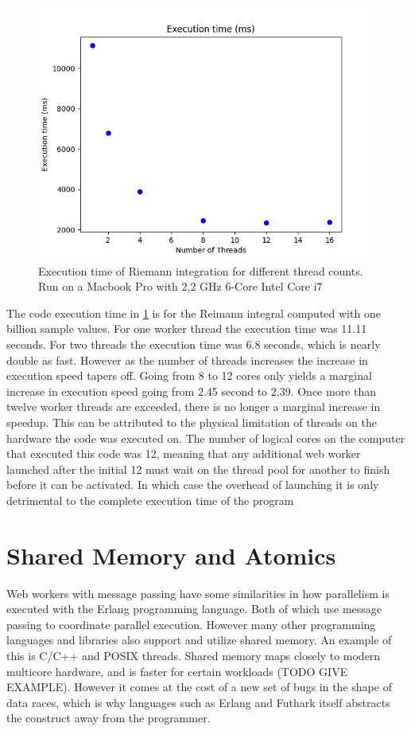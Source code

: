 \documentclass[11pt]{book}
\begin{document}
\begin{figure}[H]
\centerline{\includegraphics[width=\textwidth]{figures/integrate_exe_times.png}}
\caption{Execution time of Riemann integration for different thread counts. Run on a Macbook Pro with 2,2 GHz 6-Core Intel Core i7}
\label{png:integrate}
\end{figure}

The code execution time in \ref{png:integrate} is for the Reimann integral computed with one billion sample values. For one worker thread the execution time was 11.11 seconds. For two threads the execution time was 6.8 seconds, which is nearly double as fast. However as the number of threads increases the increase in execution speed tapers off. Going from 8 to 12 cores only yields a marginal increase in execution speed going from 2.45 second to 2.39. Once more than twelve worker threads are exceeded, there is no longer a marginal increase in speedup. This can be attributed to the physical limitation of threads on the hardware the code was executed on. The number of logical cores on the computer that executed this code was 12, meaning that any additional web worker launched after the initial 12 must wait on the thread pool for another to finish before it can be activated. In which case the overhead of launching it is only detrimental to the complete execution time of the program


\section{Shared Memory and Atomics}

Web workers with message passing have some similarities in how parallelism is executed with the Erlang programming language. Both of which use message passing to coordinate parallel execution. However many other programming languages and libraries also support and utilize shared memory. An example of this is C/C++ and POSIX threads. Shared memory maps closely to modern multicore hardware, and is faster for certain workloads (TODO GIVE EXAMPLE). However it comes at the cost of a new set of bugs in the shape of data races, which is why languages such as Erlang and Futhark itself abstracts the construct away from the programmer.
\end{document}
